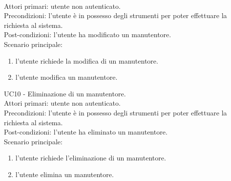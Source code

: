 \\
Attori primari: utente non autenticato.
\\
Precondizioni: l'utente è in possesso degli strumenti per poter effettuare la richiesta al sistema.
\\
Post-condizioni: l'utente ha modificato un manutentore.
\\
Scenario principale:
\begin{enumerate}
    \item l'utente richiede la modifica di un manutentore.
    \item l'utente modifica un manutentore.
\end{enumerate}
\leavevmode\newline
UC10 - Eliminazione di un manutentore.
\\
Attori primari: utente non autenticato.
\\
Precondizioni: l'utente è in possesso degli strumenti per poter effettuare la richiesta al sistema.
\\
Post-condizioni: l'utente ha eliminato un manutentore.
\\
Scenario principale:
\begin{enumerate}
    \item l'utente richiede l'eliminazione di un manutentore.
    \item l'utente elimina un manutentore.
\end{enumerate}

